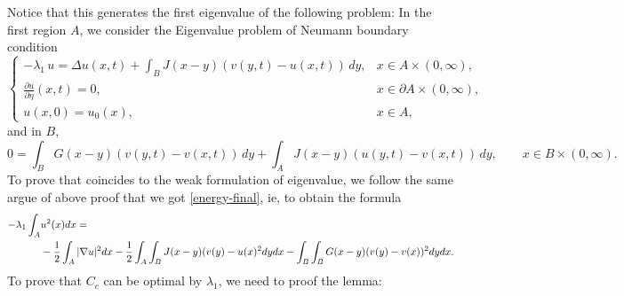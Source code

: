 \documentclass[reqno]{amsart}
\numberwithin{equation}{section}
\begin{document}
Notice that this generates the first eigenvalue of the following problem: In the first region $A$, we consider the Eigenvalue problem of Neumann boundary condition
\begin{equation}\label{eigenvaluelocalp-e}
\begin{cases}
    -\lambda_1\, u=\Delta u(x,t)+ \int_B J(x-y)(v(y,t)-u(x,t))\,dy, &  x\in A\times (0,\infty),  \\
    \displaystyle \frac{\partial u}{\partial \eta}(x,t)=0, & x\in \partial A \times (0,\infty),\\
    u(x,0)=u_0(x), & x\in A,
\end{cases}
\end{equation}
and in $B$,
\begin{equation}\label{e-elliptic}
   0 = \int_B G(x-y)(v(y,t)-v(x,t))\,dy
        +\int_A J(x-y)(u(y,t)-v(x,t))\,dy,
   \qquad x\in B\times (0,\infty).
\end{equation}
To prove that coincides to the weak formulation of eigenvalue, we follow the same argue of above proof that we got \eqref{energy-final}, ie, to obtain the formula 
\begin{align}
-\lambda_1 \int_A &u^2(x)dx=\\
&-\frac{1}{2}\int_A |\nabla u|^2dx-\frac{1}{2}\int_A\int_BJ(x-y)(v(y)-u(x)^2dydx - \int_B\int_BG(x-y)(v(y)-v(x))^2dydx.\notag
\end{align}
To prove that $C_c$ can be optimal by $\lambda_1$, we need to proof the lemma:
\end{document}
